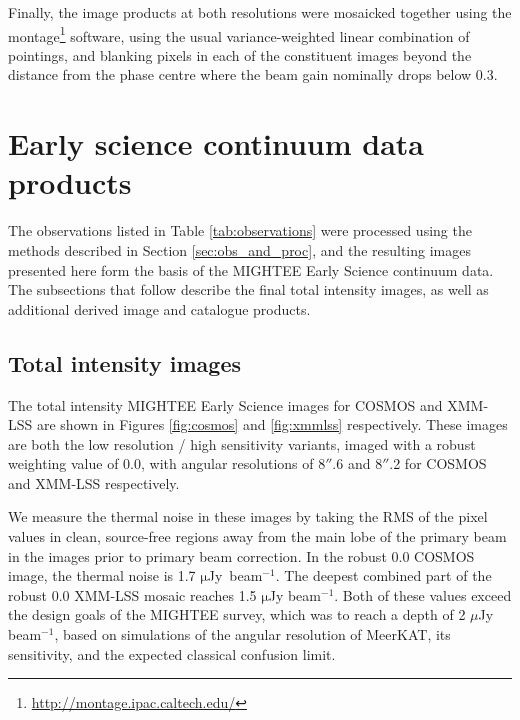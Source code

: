 \documentclass[usenatbib,usedcolumn]{mnras}
\begin{document}
Finally, the image products at both resolutions were mosaicked together using the {\sc montage}\footnote{\url{http://montage.ipac.caltech.edu/}} software, using the usual variance-weighted linear combination of pointings, and blanking pixels in each of the constituent images beyond the distance from the phase centre where the beam gain nominally drops below 0.3. 



\section{Early science continuum data products}
\label{sec:results}

The observations listed in Table \ref{tab:observations} were processed using the methods described in Section \ref{sec:obs_and_proc}, and the resulting images presented here form the basis of the MIGHTEE Early Science continuum data. The subsections that follow describe the final total intensity images, as well as additional derived image and catalogue products. 

\subsection{Total intensity images}
\label{sec:images}

The total intensity MIGHTEE Early Science images for COSMOS and XMM-LSS are shown in Figures \ref{fig:cosmos} and \ref{fig:xmmlss} respectively. These images are both the low resolution / high sensitivity variants, imaged with a robust weighting value of 0.0, with angular resolutions of 8$''$.6 and 8$''$.2 for COSMOS and XMM-LSS respectively. 

We measure the thermal noise in these images by taking the RMS of the pixel values in clean, source-free regions away from the main lobe of the primary beam in the images prior to primary beam correction. In the robust 0.0 COSMOS image, the thermal noise is 1.7 $\mathrm{\mu}$Jy~beam$^{-1}$. The deepest combined part of the robust 0.0 XMM-LSS mosaic reaches 1.5 $\mathrm{\mu}$Jy beam$^{-1}$. Both of these values exceed the design goals of the MIGHTEE survey, which was to reach a depth of 2 $\mu$Jy beam$^{-1}$, based on simulations of the angular resolution of MeerKAT, its sensitivity, and the expected classical confusion limit. 
\end{document}
